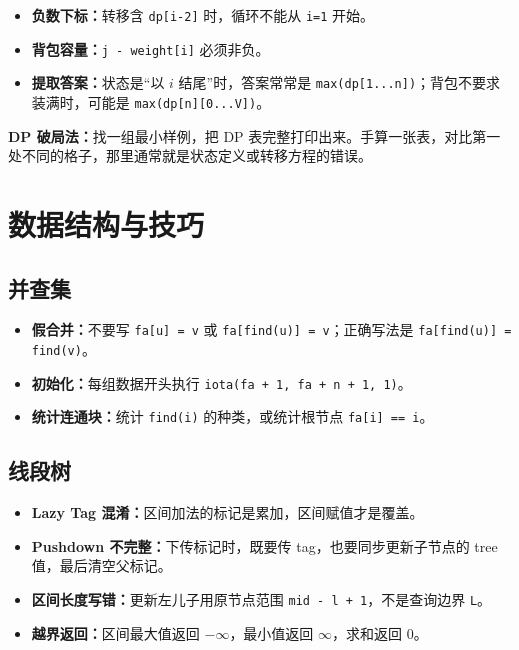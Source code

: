 \documentclass[UTF8,openany,oneside,zihao=-4]{ctexbook}
\newcommand{\note}[1]{%
  \vspace{0.35em}
  \noindent\colorbox{softblue}{%
    \parbox{\dimexpr\linewidth-2\fboxsep}{\textcolor{ink}{#1}}}%
  \vspace{0.35em}
}
\begin{document}
\begin{itemize}
  \item \textbf{负数下标：}转移含 \lstinline!dp[i-2]! 时，循环不能从 \lstinline!i=1! 开始。
  \item \textbf{背包容量：}\lstinline!j - weight[i]! 必须非负。
  \item \textbf{提取答案：}状态是“以 $i$ 结尾”时，答案常常是 \lstinline!max(dp[1...n])!；背包不要求装满时，可能是 \lstinline!max(dp[n][0...V])!。
\end{itemize}

\note{\textbf{DP 破局法：}找一组最小样例，把 DP 表完整打印出来。手算一张表，对比第一处不同的格子，那里通常就是状态定义或转移方程的错误。}

\section{数据结构与技巧}

\subsection{并查集}

\begin{itemize}
  \item \textbf{假合并：}不要写 \lstinline!fa[u] = v! 或 \lstinline!fa[find(u)] = v!；正确写法是 \lstinline!fa[find(u)] = find(v)!。
  \item \textbf{初始化：}每组数据开头执行 \lstinline!iota(fa + 1, fa + n + 1, 1)!。
  \item \textbf{统计连通块：}统计 \lstinline!find(i)! 的种类，或统计根节点 \lstinline!fa[i] == i!。
\end{itemize}

\subsection{线段树}

\begin{itemize}
  \item \textbf{Lazy Tag 混淆：}区间加法的标记是累加，区间赋值才是覆盖。
  \item \textbf{Pushdown 不完整：}下传标记时，既要传 tag，也要同步更新子节点的 tree 值，最后清空父标记。
  \item \textbf{区间长度写错：}更新左儿子用原节点范围 \lstinline!mid - l + 1!，不是查询边界 \lstinline!L!。
  \item \textbf{越界返回：}区间最大值返回 $-\infty$，最小值返回 $\infty$，求和返回 0。
\end{itemize}
\end{document}
